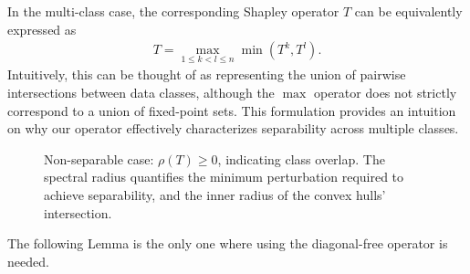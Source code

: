 \documentclass{article}
\renewcommand{\geq}{\geqslant}
\renewcommand{\leq}{\leqslant}
\begin{document}
In the multi-class case, the corresponding Shapley operator $T$ can be equivalently expressed as
\begin{align}
T = \max_{1 \leq k < l \leq n}\min(T^k, T^l).
\end{align}
Intuitively, this can be thought of as representing the union of pairwise intersections between data classes, although the $\max$ operator does not strictly correspond to a union of fixed-point sets. This formulation provides an intuition on why our operator effectively characterizes separability across multiple classes.

\begin{figure}[htbp]
    \centering
    \resizebox{0.5\textwidth}{!}{\clipbox{0.15\width{} 0.15\height{} 0.15\width{} 0.15\height{}}{}}
    \caption{Non-separable case: $\rho(T) \geq 0$, indicating class overlap. The spectral radius quantifies the minimum perturbation required to achieve separability, and the inner radius of the convex hulls' intersection.}
    \label{fig:non_separable}
\end{figure}

The following Lemma is the only one where using the diagonal-free operator is needed.
\end{document}
